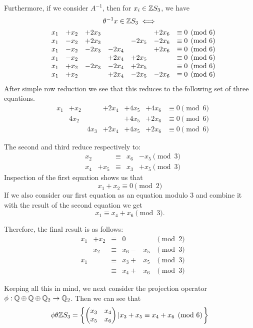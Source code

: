 \documentclass[11pt]{report}
\begin{document}
 Furthermore, if we consider $A^{-1}$, then for $x_i\in \mathbb{Z}S_3$, we have
\begin{gather*}
\theta^{-1}x\in \mathbb{Z}S_3\iff\\
\begin{matrix}
&x_1&+x_2&+2x_3&&&+2x_6&\equiv0\pmod{6}\\
&x_1  &-x_2&+2x_3& &-2x_5  &-2x_6&\equiv0\pmod{6}\\
&x_1  &-x_2  &-2x_3  &-2x_4&&+2x_6&\equiv0\pmod{6}\\
&x_1  &-x_2&&+2x_4&+2x_5&&\equiv0\pmod{6}\\
&x_1&+x_2  &-2x_3  &-2x_4&+2x_5&&\equiv 0\pmod{6}\\
&x_1&+x_2 &&+2x_4  &-2x_5 &-2x_6&\equiv0\pmod{6}
\end{matrix}
\end{gather*}
After simple row reduction we see that this reduces to the 
following set of three equations.
\[
\begin{matrix}
&x_1&+x_2&&+2x_4&+4x_5&+4x_6&\equiv0\pmod{6}\\
      &  &4x_2&&     &+4x_5&+2x_6&\equiv0\pmod{6}\\
&     &           &4x_3 &+2x_4&+4x_5 &+2x_6&\equiv 0\pmod{6}
\end{matrix}
\]

The second and third reduce respectively to:
\[
\begin{matrix}
&x_2&&\equiv &x_6 &-x_5\pmod{3}\\
&x_4&+x_5&\equiv&x_3&+x_5\pmod{3}
\end{matrix}
\]
Inspection of the       first equation shows us that
\[x_1+x_2\equiv0\pmod{2}\]
If we also consider our first equation as an equation modulo $3$ 
and combine it with the result
of the second equation we get
\[
x_1\equiv x_4+x_6\pmod{3}.\]

Therefore, the final result is as follows:
\[
\begin{matrix}
&x_1&+x_2&\equiv&0&&\pmod{2}\\
&&x_2&\equiv&x_6 - &x_5&\pmod{3}\\
&x_1&&\equiv&x_3+&x_5&\pmod{3}\\
&&&\equiv&x_4+&x_6&\pmod{3}
\end{matrix}
\]

 Keeping all this in mind, we next consider the projection operator 
$\phi: \mathbb{Q}\oplus \mathbb{Q}\oplus \mathbb{Q}_2\to \mathbb{Q}_2$. Then we can see 
that
\[\phi\theta \mathbb{Z}S_3 = \left\{
\begin{pmatrix}
x_3&x_4\\
x_5&x_6
\end{pmatrix} \left| x_3+x_5 \equiv x_4+x_6\pmod{6}\right. \right\}\]
\end{document}
